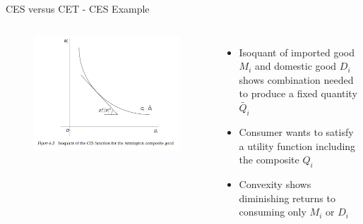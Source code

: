\documentclass[11pt,aspectratio=169]{beamer}
\begin{document}
\begin{frame}{CES versus CET - CES Example}

\begin{columns}[T,onlytextwidth]
	
	\begin{figure}
		\hspace{-2em}
		\vspace{1em}
		\includegraphics[width=1\textwidth]{exhibits/CES_example.PNG} 
	\end{figure}
	
	
	\begin{itemize}
		
		\setlength\itemsep{2em}
		
		\item Isoquant of imported good $M_i$ and domestic good $D_i$ shows combination needed to produce a fixed quantity $\tilde{Q_i}$
		
		\item Consumer wants to satisfy a utility function including the composite $Q_i$ 
		
		\item Convexity shows diminishing returns to consuming only $M_i$ or $D_i$
		
	\end{itemize}
	
\end{columns}

\end{frame}
\end{document}
